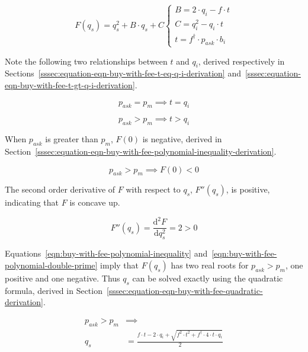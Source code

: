 \documentclass[table, twocolumn]{article}
\begin{document}
\begin{equation}\label{eqn:buy-with-fee-polynomial}
	F(q_s) = q_s^2 + B \cdot q_s + C
	\begin{cases}
		B = 2 \cdot q_i - f \cdot t \\
		C = q_i^2 - q_i \cdot t     \\
		t = f^{\dagger} \cdot p_{ask} \cdot b_i
	\end{cases}
\end{equation}

Note the following two relationships between $t$ and $q_i$, derived respectively in
Sections~\ref{sssec:equation-eqn-buy-with-fee-t-eq-q-i-derivation}
and~\ref{sssec:equation-eqn-buy-with-fee-t-gt-q-i-derivation}.

\begin{equation}\label{eqn:buy-with-fee-t-eq-q_i}
	p_{ask} = p_m \implies t = q_i
\end{equation}

\begin{equation}\label{eqn:buy-with-fee-t-gt-q_i}
	p_{ask} > p_m \implies t > q_i
\end{equation}

When $p_{ask}$ is greater than $p_m$, $F(0)$ is negative, derived in
Section~\ref{sssec:equation-eqn-buy-with-fee-polynomial-inequality-derivation}.

\begin{equation}\label{eqn:buy-with-fee-polynomial-inequality}
	p_{ask} > p_m \implies F(0) < 0
\end{equation}

The second order derivative of $F$ with respect to $q_s$, $F''(q_s)$, is positive,
indicating that $F$ is concave up.

\begin{equation}\label{eqn:buy-with-fee-polynomial-double-prime}
	F''(q_s) = \frac{\mathrm{d}^2 F}{\mathrm{d}q_s^2} = 2 > 0
\end{equation}

Equations~\ref{eqn:buy-with-fee-polynomial-inequality}
and~\ref{eqn:buy-with-fee-polynomial-double-prime} imply that $F(q_s)$ has two real
roots for $p_{ask} > p_m$, one positive and one negative. Thus $q_s$ can be solved
exactly using the quadratic formula, derived in
Section~\ref{sssec:equation-eqn-buy-with-fee-quadratic-derivation}.

\begin{equation}\label{eqn:buy-with-fee-quadratic}
	\begin{aligned}
		p_{ask} > p_m & \implies                          \\
		q_s           & = \frac{f \cdot t - 2 \cdot q_i +
			\sqrt{f^2 \cdot t^2 + f^{\dagger} \cdot 4 \cdot t \cdot q_i}}{2}
	\end{aligned}
\end{equation}
\end{document}
